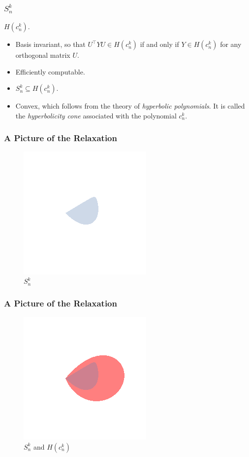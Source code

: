 \documentclass{beamer}
\begin{document}
\begin{frame}
    \frametitle{$S^k_n$}
    $H(c^k_n)$.
    \begin{itemize}
        \item Basis invariant, so that $U^{\intercal} Y U \in H(c^k_n)$ if and only if $Y \in H(c^k_n)$ for any orthogonal matrix $U$.
        \pause
        \item Efficiently computable.
        \pause
        \item $S^k_n \subseteq H(c^k_n).$
        \pause
        \item Convex, which follows from the theory of \emph{hyperbolic polynomials}. It is called the \emph{hyperbolicity cone} associated with the polynomial $c_n^k$.
    \end{itemize}
\end{frame}
\begin{frame}
    \frametitle{A Picture of the Relaxation}
    \begin{figure}[h]
        \centering
        \includegraphics[width=0.6\linewidth]{just_snk.png}
        \caption{$S^{k}_n$}%
        \label{fig:just_snk}
    \end{figure}
\end{frame}
\begin{frame}
    \frametitle{A Picture of the Relaxation}
    \begin{figure}[h]
        \centering
        \includegraphics[width=0.6\linewidth]{comparison.png}
        \caption{$S^{k}_n$ and $H(c^k_n)$}%
        \label{fig:just_snk}
    \end{figure}
\end{frame}
\end{document}
